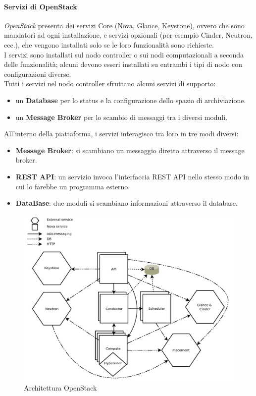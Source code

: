 \documentclass{article}
\begin{document}
\paragraph{Servizi di OpenStack}
\textit{OpenStack} presenta dei servizi Core (Nova, Glance, Keystone), ovvero che sono mandatori ad ogni installazione, e servizi opzionali (per esempio Cinder, Neutron, ecc.), che vengono installati solo se le loro funzionalità sono richieste.\\
I servizi sono installati sul nodo controller o sui nodi computazionali a seconda delle funzionalità; alcuni devono esseri installati su entrambi i tipi di nodo con configurazioni diverse. \\
Tutti i servizi nel nodo controller sfruttano alcuni servizi di supporto: 
\begin{itemize}
    \item un \textbf{Database} per lo status e la configurazione dello spazio di archiviazione.
    \item un \textbf{Message Broker} per lo scambio di messaggi tra i diversi moduli.
\end{itemize}
All'interno della piattaforma, i servizi interagisco tra loro in tre modi diversi:
\begin{itemize}
    \item \textbf{Message Broker}: si scambiano un messaggio diretto attraverso il message broker.
    \item \textbf{REST API}: un servizio invoca l'interfaccia REST API nello stesso modo in cui lo farebbe un programma esterno.
    \item \textbf{DataBase}: due moduli si scambiano informazioni attraverso il database.
\end{itemize}           
\begin{figure}[H]
    \centering
    \includegraphics[scale=0.30]{img/info_exchange.png}
    \caption{Architettura OpenStack}
\end{figure}\noindent
\end{document}
